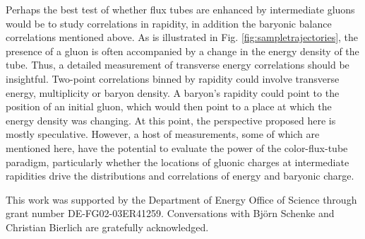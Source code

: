 \documentclass[aps, prc, 12pt, nofootinbib, showpacs, superscriptaddress, tightenlines, groupedaddress]{revtex4-2}
\begin{document}
Perhaps the best test of whether flux tubes are enhanced by intermediate gluons would be to study correlations in rapidity, in addition the baryonic balance correlations mentioned above. As is illustrated in Fig. \ref{fig:sampletrajectories}, the presence of a gluon is often accompanied by a change in the energy density of the tube. Thus, a detailed measurement of transverse energy correlations should be insightful. Two-point correlations binned by rapidity could involve transverse energy, multiplicity or baryon density. A baryon's rapidity could point to the position of an initial gluon, which would then point to a place at which the energy density was changing. At this point, the perspective proposed here is mostly speculative. However, a host of measurements, some of which are mentioned here, have the potential to evaluate the power of the color-flux-tube paradigm, particularly whether the locations of gluonic charges at intermediate rapidities drive the distributions and correlations of energy and baryonic charge.

\begin{acknowledgments}
This work was supported by the Department of Energy Office of Science through grant number DE-FG02-03ER41259. Conversations with Bj\"orn Schenke and Christian Bierlich are gratefully acknowledged.
\end{acknowledgments}


\end{document}
